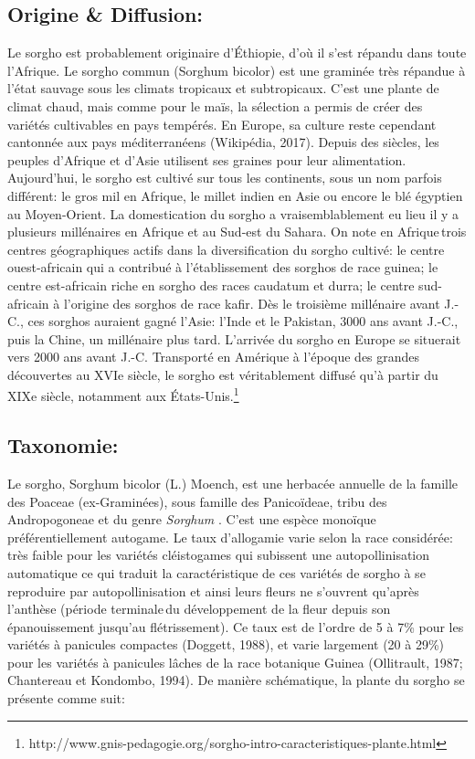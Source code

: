\documentclass[a4paper,11pt]{article}
\begin{document}
  
\subsection{Origine \& Diffusion:}
Le sorgho est probablement originaire d’Éthiopie, d’où il s’est
répandu dans toute l’Afrique. Le sorgho commun (Sorghum bicolor) est
une graminée très répandue à l’état sauvage sous les climats tropicaux
et subtropicaux. C’est une plante de climat chaud, mais comme pour le
maïs, la sélection a permis de créer des variétés cultivables en pays
tempérés. En Europe, sa culture reste cependant cantonnée aux pays
méditerranéens (Wikipédia, 2017). Depuis des siècles, les peuples
d’Afrique et d’Asie utilisent ses graines pour leur
alimentation. Aujourd’hui, le sorgho est cultivé sur tous les
continents, sous un nom parfois différent: le gros mil en Afrique, le
millet indien en Asie ou encore le blé égyptien au Moyen-Orient. La
domestication du sorgho a vraisemblablement eu lieu il y a plusieurs
millénaires en Afrique et au Sud-est du Sahara.  On note en
Afrique\,trois centres géographiques actifs dans la diversification du
sorgho cultivé: le centre ouest-africain qui a contribué à
l’établissement des sorghos de race guinea; le centre est-africain
riche en sorgho des races caudatum et durra; le centre sud-africain à
l’origine des sorghos de race kafir. Dès le troisième millénaire
avant J.-C., ces sorghos auraient gagné l’Asie: l’Inde et le Pakistan,
3000 ans avant J.-C., puis la Chine, un millénaire plus
tard. L’arrivée du sorgho en Europe se situerait vers 2000 ans avant
J.-C. Transporté en Amérique à l’époque des grandes découvertes au
XVIe siècle, le sorgho est véritablement diffusé qu’à partir du XIXe
siècle, notamment aux
États-Unis.\footnote{http://www.gnis-pedagogie.org/sorgho-intro-caracteristiques-plante.html}

\subsection{Taxonomie:}
Le sorgho, Sorghum bicolor (L.) Moench, est une herbacée annuelle de
la famille des Poaceae (ex-Graminées), sous famille des Panicoïdeae,
tribu des Andropogoneae et du genre \emph{Sorghum}
\cite{Doggett_1988}. C’est une espèce monoïque préférentiellement
autogame. Le taux d’allogamie varie selon la race considérée: très
faible pour les variétés cléistogames qui subissent une
autopollinisation automatique ce qui traduit la caractéristique de ces
variétés de sorgho à se reproduire par autopollinisation et ainsi
leurs fleurs ne s’ouvrent qu’après l’anthèse (période terminale\,du
développement de la fleur depuis son épanouissement jusqu’au
flétrissement). Ce taux est de l’ordre de 5 à 7\% pour les variétés à
panicules compactes (Doggett, 1988), et varie largement (20 à 29\%)
pour les variétés à panicules lâches de la race botanique Guinea
(Ollitrault, 1987; Chantereau et Kondombo, 1994). De manière
schématique, la plante du sorgho se présente comme suit:
\end{document}
